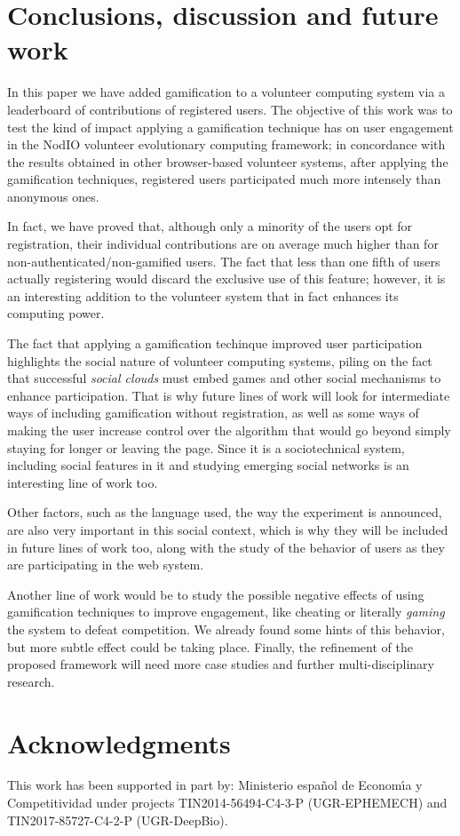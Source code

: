 \documentclass{llncs}
\begin{document}
\section{Conclusions, discussion and future work}

In this paper we have added gamification to a volunteer computing
system via a leaderboard of contributions of registered users. The objective of this work was to test the kind of impact
applying a gamification technique has on user engagement in
the {\sf NodIO}
volunteer evolutionary computing framework; in concordance with
the results obtained in other
browser-based volunteer systems, after
applying the gamification techniques, registered users participated much more intensely than anonymous ones.

In fact, we have proved that, although only a minority of the users opt
for registration, their individual contributions are on average much
higher than for non-authenticated/non-gamified users. The fact that less
than one fifth of users actually registering would discard the
exclusive use of this feature; however, it is an interesting addition
to the volunteer system that in fact enhances its computing power.

The fact that applying a gamification techinque improved user participation highlights the social nature of volunteer computing systems, piling on the fact that successful {\em social clouds} must embed games and other social mechanisms to enhance participation. That is why future lines of work will look for intermediate ways of including
gamification without registration, as well as some ways of making the
user increase control over the algorithm that would go beyond simply
staying for longer or leaving the page. Since it is a sociotechnical
system, including social features in it and studying emerging social
networks is an interesting line of work too.

Other factors, such as the language used, the way the experiment is
announced, are also very important in this social context, which is
why they will be included in future lines of work too, along with the
study of the behavior of users as they are participating
in the web system.

Another line of work would be to study the possible negative effects of using
gamification techniques to improve engagement, like cheating or
literally {\em gaming} the system to defeat competition. We already
found some hints of this behavior, but more subtle effect could be taking place.
Finally, the refinement of the proposed framework will need
more case studies and further multi-disciplinary research.


\section*{Acknowledgments}

This work has been supported in part by: Ministerio espa\~{n}ol de
 Econom\'{\i}a y Competitividad under projects TIN2014-56494-C4-3-P
 (UGR-EPHEMECH) and TIN2017-85727-C4-2-P (UGR-DeepBio).





\end{document}
